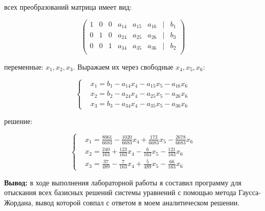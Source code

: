 \documentclass{report}
\begin{document}
\begin{itemize}
				 всех преобразований матрица имеет вид:
			
			\begin{center}
				\Large{
					\[
					\begin{pmatrix}
						1 & 0 & 0 & a_{14} & a_{15} & a_{16} & | & b_{1} \\
						0 & 1 & 0 & a_{24} & a_{25} & a_{26} & | & b_{3} \\
						0 & 0 & 1 & a_{34} & a_{35} & a_{36} & | & b_{2} \\
					\end{pmatrix}
					\]
				}
			\end{center}
			
			
			 переменные: $x_1, x_2, x_3$. Выражаем их через свободные $x_4, x_5, x_6$:
			
			\[
			\left\{
			\begin{aligned}
				&x_1 = b_1 - a_{14}x_4 - a_{15}x_5 - a_{16}x_6 \\
				&x_2 = b_2 - a_{24}x_4 - a_{25}x_5 - a_{26}x_6 \\
				&x_3 = b_3 - a_{34}x_4 - a_{35}x_5 - a_{36}x_6
			\end{aligned}
			\right.
			\]
			
			
			 решение:
			
			\[
			\left\{
			\begin{aligned}
				&x_1 = \frac{8061}{6683} - \frac{1020}{6683}x_4 + \frac{173}{6683}x_5 - \frac{2678}{6683}x_6 \\
				&x_2 = \frac{240}{163} + \frac{123}{163}x_4 - \frac{6}{163}x_5 - \frac{121}{163}x_6 \\
				&x_3 = \frac{37}{489} - \frac{7}{163}x_4 + \frac{5}{489}x_5 - \frac{66}{163}x_6
			\end{aligned}
			\right.
			\]

		

\end{itemize}

	
	
	
	





	\textbf{Вывод: }в ходе выполнения лабораторной работы я составил программу для отыскания всех базисных решений системы уравнений с помощью метода Гаусса-Жордана, вывод которой совпал с  ответом в моем аналитическом решении.
\end{document}
